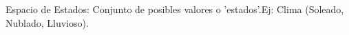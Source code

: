 \documentclass[preview]{standalone}
\begin{document}
\begin{center}
Espacio de Estados: Conjunto de posibles valores o 'estados'.Ej: Clima (Soleado, Nublado, Lluvioso).
\end{center}
\end{document}

